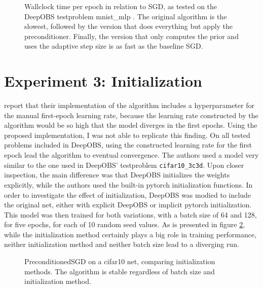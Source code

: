 \documentclass[twoside,12pt,a4paper]{report}
\begin{document}
\begin{figure}
	\centering \hspace{-1,5cm}
	
	\caption{Wallclock time per epoch in relation to SGD, as tested on the DeepOBS testproblem mnist\_mlp . The original algorithm is the slowest, followed by the version that does everything but apply the preconditioner. Finally, the version that only computes the prior and uses the adaptive step size is as fast as the baseline SGD.}
	\label{fig:exp_perf_prec}
	
\end{figure}


\section{Experiment 3: Initialization}
\cite{roos2019active} report that their implementation of the algorithm includes a hyperparameter for the manual first-epoch learning rate, because the learning rate constructed by the algorithm would be so high that the model diverges in the first epochs. Using the proposed implementation, I was not able to replicate this finding. On all tested problems included in DeepOBS, using the constructed learning rate for the first epoch lead the algorithm to eventual convergence. The authors used a model very similar to the one used in DeepOBS' testproblem \verb|cifar10_3c3d|. Upon closer inspection, the main difference was that DeepOBS initializes the weights explicitly, while the authors used the built-in pytorch initialization functions.
In order to investigate the effect of initialization, DeepOBS was modied to include the original net, either with explicit DeepOBS or implicit pytorch initialization. This model was then trained for both variations, with a batch size of 64 and 128, for five epochs, for each of 10 random seed values.
As is presented in figure \ref{fig:exp_init}, while the initialization method certainly plays a big role in training performance, neither initialization method and neither batch size lead to a diverging run.
\begin{figure}
	\centering \hspace{-1,5cm}
	
	\caption{PreconditionedSGD on a cifar10 net, comparing initialization methods. The algorithm is stable regardless of batch size and initialization method.}
	\label{fig:exp_init}
	
\end{figure}
\end{document}
